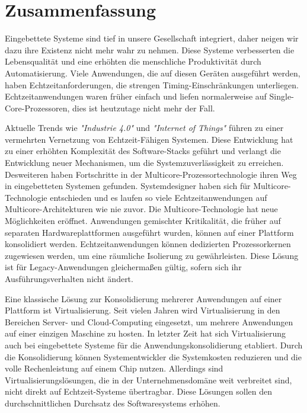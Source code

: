 \chapter*{Zusammenfassung}

Eingebettete Systeme sind tief in unsere Gesellschaft integriert, daher neigen wir dazu ihre Existenz nicht mehr wahr zu nehmen.
Diese Systeme verbesserten die Lebensqualit{\"a}t und eine erh{\"o}hten die menschliche Produktivit{\"a}t durch Automatisierung.
Viele Anwendungen, die auf diesen Ger{\"a}ten ausgef{\"u}hrt werden, haben Echtzeitanforderungen, die strengen Timing-Einschr{\"a}nkungen unterliegen.
Echtzeitanwendungen waren fr{\"u}her einfach und liefen normalerweise auf Single-Core-Prozessoren, dies ist heutzutage nicht mehr der Fall.

Aktuelle Trends wie \emph{"Industrie 4.0"} und \emph{"Internet of Things"} führen zu einer vermehrten Vernetzung von Echtzeit-Fähigen Systemen.
Diese Entwicklung hat zu einer erh{\"o}hten Komplexit{\"a}t des Software-Stacks gef{\"u}hrt und verlangt die Entwicklung neuer
Mechanismen, um die Systemzuverl{\"a}ssigkeit zu erreichen.
Desweiteren haben Fortschritte in der Multicore-Prozessortechnologie ihren Weg in eingebetteten Systemen gefunden.
Systemdesigner haben sich f{\"u}r Multicore-Technologie entschieden und es laufen so viele Echtzeitanwendungen auf Multicore-Architekturen wie nie zuvor.
Die Multicore-Technologie hat neue M{\"o}glichkeiten er{\"o}ffnet.
Anwendungen gemischter Kritikalit{\"a}t, die fr{\"u}her auf separaten Hardwareplattformen ausgef{\"u}hrt wurden, k{\"o}nnen auf einer Plattform konsolidiert werden.
Echtzeitanwendungen k{\"o}nnen dedizierten Prozessorkernen zugewiesen werden, um eine r{\"a}umliche Isolierung zu gew{\"a}hrleisten.
Diese L{\"o}sung ist f{\"u}r Legacy-Anwendungen gleicherma{\ss}en g{\"u}ltig, sofern sich ihr Ausf{\"u}hrungsverhalten nicht ändert.

Eine klassische L{\"o}sung zur Konsolidierung mehrerer Anwendungen auf einer Plattform ist Virtualisierung.
Seit vielen Jahren wird Virtualisierung in den Bereichen Server- und Cloud-Computing eingesetzt, um mehrere Anwendungen auf einer einzigen Maschine zu hosten.
In letzter Zeit hat sich Virtualisierung auch bei eingebettete Systeme  f{\"u}r die Anwendungskonsolidierung etabliert.
Durch die Konsolidierung k{\"o}nnen Systementwickler die Systemkosten reduzieren und die volle Rechenleistung auf einem Chip nutzen.
Allerdings sind Virtualisierungsl{\"o}sungen, die in der Unternehmensdom{\"a}ne weit verbreitet sind, nicht direkt auf Echtzeit-Systeme übertragbar.
Diese L{\"o}sungen sollen den durchschnittlichen Durchsatz des Softwaresystems erh{\"o}hen.

